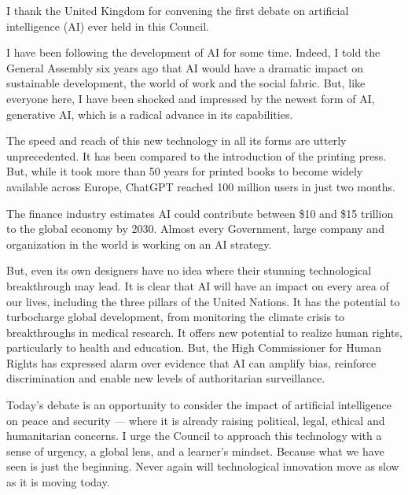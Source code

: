 {\lorafont\fontsize{10.4}{13.9}\selectfont
\setlength{\parindent}{1.2em}
\linenumbers
I thank the United Kingdom for convening the first debate on artificial intelligence (AI) ever held in this Council.\par
I have been following the development of AI for some time. Indeed, I told the General Assembly six years ago that AI would have a dramatic impact on sustainable development, the world of work and the social fabric. But, like everyone here, I have been shocked and impressed by the newest form of AI, generative AI, which is a radical advance in its capabilities.\par
The speed and reach of this new technology in all its forms are utterly unprecedented. It has been compared to the introduction of the printing press. But, while it took more than 50 years for printed books to become widely available across Europe, ChatGPT reached 100 million users in just two months.\par
The finance industry estimates AI could contribute between \$10 and \$15 trillion to the global economy by 2030. Almost every Government, large company and organization in the world is working on an AI strategy.\par
But, even its own designers have no idea where their stunning technological breakthrough may lead. It is clear that AI will have an impact on every area of our lives, including the three pillars of the United Nations. It has the potential to turbocharge global development, from monitoring the climate crisis to breakthroughs in medical research. It offers new potential to realize human rights, particularly to health and education. But, the High Commissioner for Human Rights has expressed alarm over evidence that AI can amplify bias, reinforce discrimination and enable new levels of authoritarian surveillance.\par
Today’s debate is an opportunity to consider the impact of artificial intelligence on peace and security — where it is already raising political, legal, ethical and humanitarian concerns. I urge the Council to approach this technology with a sense of urgency, a global lens, and a learner’s mindset. Because what we have seen is just the beginning. Never again will technological innovation move as slow as it is moving today.\par
}
